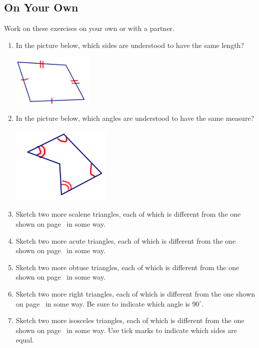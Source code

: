 \documentclass[12pt, reqno]{amsart}
\theoremstyle{remark}
\theoremstyle{definition}
\numberwithin{equation}{section}  %
\begin{document}
\subsection*{On Your Own}
Work on these exercises on your own or with a partner.  
\begin{enumerate}
\item
In the picture below, which sides are understood to have the same length?
\begin{center}
\includegraphics[height=2.5cm]{whatseq}  
\end{center}

\item
In the picture below, which angles are understood to have the same measure?
\begin{center}
\includegraphics[height=3.7cm]{whatseq2}  
\end{center}


\item
Sketch two more scalene triangles, each of which is different from the one shown on page~\pageref{def:trisides} in some way.  \\
\item
Sketch two more acute triangles, each of which is different from the one shown on page~\pageref{def:triangs} in some way.\\
\item
Sketch two more obtuse triangles, each of which is different from the one shown on page~\pageref{def:triangs} in some way.\\
\item
Sketch two more right triangles, each of which is different from the one shown on page~\pageref{def:triangs} in some way.  Be sure to indicate which angle is $90^\circ$.\\
\item
Sketch two more isosceles triangles, each of which is different from the one shown on page~\pageref{def:trisides} in some way.  Use tick marks to indicate which sides are equal.
\end{enumerate}
\end{document}

